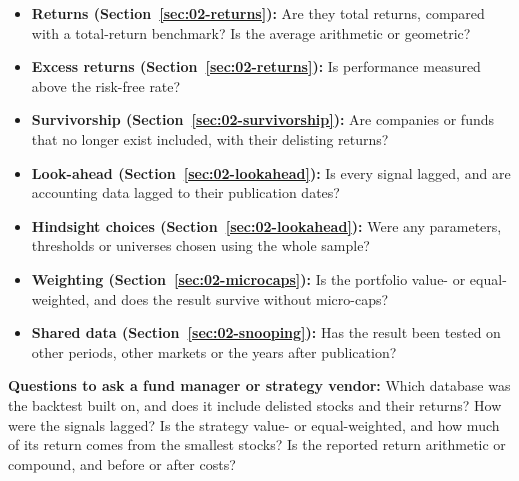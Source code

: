 \begin{itemize}
  \item[$\square$] \textbf{Returns (Section~\ref{sec:02-returns}):} Are they total returns, compared with a total-return benchmark? Is the average arithmetic or geometric?
  \item[$\square$] \textbf{Excess returns (Section~\ref{sec:02-returns}):} Is performance measured above the risk-free rate?
  \item[$\square$] \textbf{Survivorship (Section~\ref{sec:02-survivorship}):} Are companies or funds that no longer exist included, with their delisting returns?
  \item[$\square$] \textbf{Look-ahead (Section~\ref{sec:02-lookahead}):} Is every signal lagged, and are accounting data lagged to their publication dates?
  \item[$\square$] \textbf{Hindsight choices (Section~\ref{sec:02-lookahead}):} Were any parameters, thresholds or universes chosen using the whole sample?
  \item[$\square$] \textbf{Weighting (Section~\ref{sec:02-microcaps}):} Is the portfolio value- or equal-weighted, and does the result survive without micro-caps?
  \item[$\square$] \textbf{Shared data (Section~\ref{sec:02-snooping}):} Has the result been tested on other periods, other markets or the years after publication?
\end{itemize}

\textbf{Questions to ask a fund manager or strategy vendor:} Which database was the backtest built on, and does it include delisted stocks and their returns? How were the signals lagged? Is the strategy value- or equal-weighted, and how much of its return comes from the smallest stocks? Is the reported return arithmetic or compound, and before or after costs?
